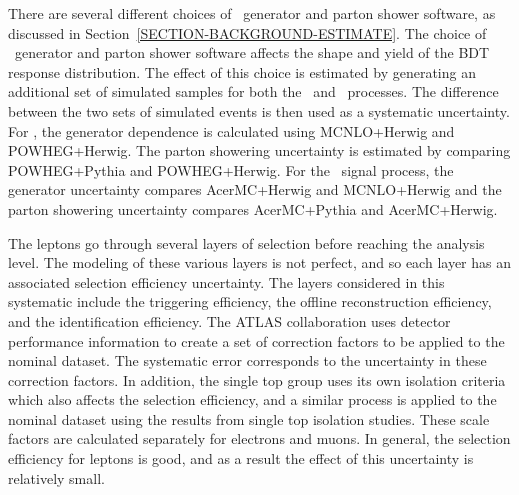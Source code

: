 {}

There are several different choices of \MC\ generator and parton shower software, as discussed in Section~\ref{SECTION-BACKGROUND-ESTIMATE}. The choice of \MC\ generator and parton shower software affects the shape and yield of the BDT response distribution. The effect of this choice is estimated by generating an additional set of simulated samples for both the \Wt\ and \ttbar\ processes. The difference between the two sets of simulated events is then used as a systematic uncertainty. For \ttbar, the generator dependence is calculated using MCNLO+Herwig and POWHEG+Herwig. The parton showering uncertainty is estimated by comparing POWHEG+Pythia and POWHEG+Herwig. For the \Wt\ signal process, the generator uncertainty compares AcerMC+Herwig and MCNLO+Herwig and the parton showering uncertainty compares AcerMC+Pythia and AcerMC+Herwig.\\

{}

The leptons go through several layers of selection before reaching the analysis level. The modeling of these various layers is not perfect, and so each layer has an associated selection efficiency uncertainty. The layers considered in this systematic include the triggering efficiency, the offline reconstruction efficiency, and the identification efficiency. The ATLAS collaboration uses detector performance information to create a set of correction factors to be applied to the nominal dataset. The systematic error corresponds to the uncertainty in these correction factors. In addition, the single top group uses its own isolation criteria which also affects the selection efficiency, and a similar process is applied to the nominal dataset using the results from single top isolation studies. These scale factors are calculated separately for electrons and muons. In general, the selection efficiency for leptons is good, and as a result the effect of this uncertainty is relatively small. \\

{}

